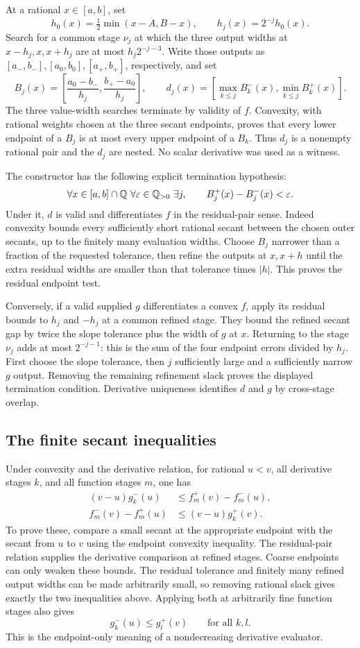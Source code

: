 At a rational $x\in[a,b]$, set
\[
 h_0(x)=\tfrac12\min(x-A,B-x),\qquad h_j(x)=2^{-j}h_0(x).
\]
Search for a common stage $\nu_j$ at which the three output widths at
$x-h_j,x,x+h_j$ are at most $h_j2^{-j-3}$.  Write those outputs as
$[a_-,b_-],[a_0,b_0],[a_+,b_+]$, respectively, and set
\[
 B_j(x)=\left[\frac{a_0-b_-}{h_j},\frac{b_+-a_0}{h_j}\right],
 \qquad
 d_j(x)=\left[\max_{k\le j}B_k^-(x),\min_{k\le j}B_k^+(x)\right].
\]
The three value-width searches terminate by validity of $f$.
Convexity, with rational weights chosen at the three secant endpoints,
proves that every lower endpoint of a $B_j$ is at most every upper
endpoint of a $B_k$.  Thus $d_j$ is a nonempty rational pair and the
$d_j$ are nested.  No scalar derivative was used as a witness.

The constructor has the following explicit termination hypothesis:
\[
 \forall x\in[a,b]\cap\Q\ \forall\varepsilon\in\Q_{>0}\ 
 \exists j,\qquad B_j^+(x)-B_j^-(x)<\varepsilon.
\]
Under it, $d$ is valid and differentiates $f$ in the residual-pair sense.
Indeed convexity bounds every sufficiently short rational secant between
the chosen outer secants, up to the finitely many evaluation widths.
Choose $B_j$ narrower than a fraction of the requested tolerance, then
refine the outputs at $x,x+h$ until the extra residual widths are smaller
than that tolerance times $|h|$.  This proves the residual endpoint test.

Conversely, if a valid supplied $g$ differentiates a convex $f$, apply its
residual bounds to $h_j$ and $-h_j$ at a common refined stage.  They bound
the refined secant gap by twice the slope tolerance plus the width of
$g$ at $x$.  Returning to the stage $\nu_j$ adds at most $2^{-j-1}$:
this is the sum of the four endpoint errors divided by $h_j$.
First choose the slope tolerance, then $j$ sufficiently large and a
sufficiently narrow $g$ output.  Removing the remaining refinement slack
proves the displayed termination condition.  Derivative uniqueness
identifies $d$ and $g$ by cross-stage overlap.

\subsection{The finite secant inequalities}
Under convexity and the derivative relation, for rational $u<v$,
all derivative stages $k$, and all function stages $m$, one has
\begin{align*}
 (v-u)g_k^-(u)&\le f_m^+(v)-f_m^-(u),\\
 f_m^-(v)-f_m^+(u)&\le(v-u)g_k^+(v).
\end{align*}
To prove these, compare a small secant at the appropriate endpoint with
the secant from $u$ to $v$ using the endpoint convexity inequality.
The residual-pair relation supplies the derivative comparison at refined
stages.  Coarse endpoints can only weaken these bounds.  The residual
tolerance and finitely many refined output widths can be made arbitrarily
small, so removing rational slack gives exactly the two inequalities above.
Applying both at arbitrarily fine function stages also gives
\[
 g_k^-(u)\le g_l^+(v)\qquad\text{for all }k,l.
\]
This is the endpoint-only meaning of a nondecreasing derivative evaluator.

